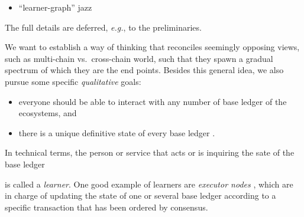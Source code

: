 \documentclass[%
dvipsnames,handout]{article}
\theoremstyle{definition}
\newcommand{\base}[1][ ]{%
  base ledger%
  \ifthenelse{\equal{#1}{ }}{}{#1}
}
\newcommand{\eg}[1][, ]{\emph{e.g.}#1}
\begin{document}
{\begin{itemize}
{\begin{quote}
        Charlotte ADDSs can \emph{intersect}, or share blocks
        \\…\\
        “what is the least ordering we actually need?”
        \\…\\
        Charlotte provides a common framework for data structures from separate
        services to \ul{reference each other}.
        \\…\\
        Charlotte data structures are naturally composable: the \emph{union} of two data structures is itself a
        data structure
        \\…\\
        the \emph{intersection} of two data
        structures comprises the data that is part of both structures. We can think of \ul{cross-shard} transactions
        appended to a sharded blockchain ADDS as data in the intersection of multiple shard ADDSs.
      \end{quote}
    }%
  \item ``learner-graph'' jazz
  \end{itemize}
  The full details are deferred,
  \eg to the preliminaries. 
}



We want to establish a way of thinking that reconciles  %
seemingly opposing views, such as multi-chain vs.\ cross-chain world, %
such that they spawn a gradual spectrum of which they are the end points. %
Besides this general idea, %
we also pursue some specific \emph{qualitative} goals: %
\begin{itemize} %
  
\item everyone should be able to  interact with any number of \base[s] of the ecosystems, %
  and %
\item there is a unique definitive state of every \base.
\end{itemize}
In technical terms, %
the person or service that acts or is inquiring the sate of the \base[s]
is called a \emph{learner}. %
One good example of learners are \emph{executor nodes} %
\cite{anoma_specs}, %
which are in charge of updating the state of one or several \base %
according to a specific transaction that has been ordered by consensus. %
\end{document}
